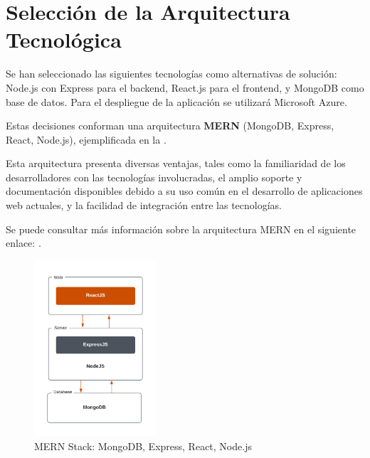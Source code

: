 \section{Selección de la Arquitectura Tecnológica} \label{sec:4_seleccion_arquitectura_tecnologica}
\hypertarget{sec:4_seleccion_arquitectura_tecnologica}{}

Se han seleccionado las siguientes tecnologías como alternativas de solución: Node.js con Express para el backend, React.js para el frontend, y MongoDB como base 
de datos. Para el despliegue de la aplicación se utilizará Microsoft Azure.

Estas decisiones conforman una arquitectura \textbf{MERN} (MongoDB, Express, React, Node.js), ejemplificada en la . 

Esta arquitectura presenta diversas ventajas, tales como la familiaridad de los desarrolladores con las tecnologías involucradas, el amplio soporte y documentación disponibles debido a su uso común en el desarrollo de aplicaciones web actuales,
y la facilidad de integración entre las tecnologías.

Se puede consultar más información sobre la arquitectura MERN en el siguiente enlace: .

\begin{figure}[H]
    \centering
    \includegraphics[width=0.4\textwidth]{figures/4-Arquitectura-tecnologica/4_MERN2.png}
    \caption{MERN Stack: MongoDB, Express, React, Node.js}
    \label{fig:arquitectura_mern}
    \hypertarget{fig:arquitectura_mern}{}
\end{figure}
